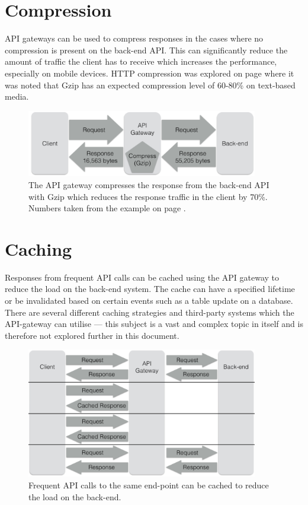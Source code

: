 \documentclass{cslthse-msc}
\begin{document}
\section{Compression}
API gateways can be used to compress responses in the cases where no compression is present on the back-end API. This can significantly reduce the amount of traffic the client has to receive which increases the performance, especially on mobile devices. HTTP compression was explored on page \pageref{compression} where it was noted that Gzip has an expected compression level of 60-80\% on text-based media.

\begin{figure}[H]
  \centering
    \begin{center}
      \includegraphics[width=0.9\textwidth]{images/api_gateway_compression.png}
    \end{center}
  \caption{The API gateway compresses the response from the back-end API with Gzip which reduces the response traffic in the client by 70\%. Numbers taken from the example on page \pageref{compression}.}
\end{figure}

\section{Caching}
Responses from frequent API calls can be cached using the API gateway to reduce the load on the back-end system\cite[page 107]{AASG}. The cache can have a specified lifetime or be invalidated based on certain events such as a table update on a database. There are several different caching strategies and third-party systems which the API-gateway can utilise --- this subject is a vast and complex topic in itself and is therefore not explored further in this document.

\begin{figure}[H]
  \centering
    \begin{center}
      \includegraphics[width=0.9\textwidth]{images/api_gateway_cache.png}
    \end{center}
  \caption{Frequent API calls to the same end-point can be cached to reduce the load on the back-end.}
\end{figure}
\end{document}
